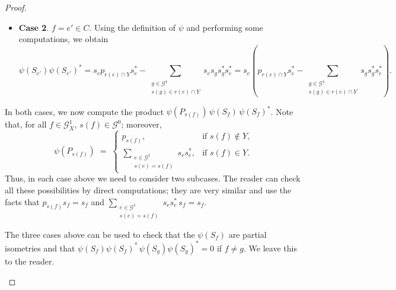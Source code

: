 \documentclass[12pt, reqno]{amsart}
\theoremstyle{definition}
\theoremstyle{remark}
\numberwithin{equation}{section}
\begin{document}
\begin{proof}
\begin{enumerate}
\begin{itemize}
\item \textbf{Case 2}. $f = e' \in C$. Using the definition of $\psi$ and performing some computations, we obtain
\[
\psi(S_{e'})\psi(S_{e'})^*
=
s_e p_{r(e) \cap Y} s_e^*
-
\sum_{\substack{g \in \mathcal{G}^1 \\ s(g) \in r(e) \cap Y}} s_e s_g s_g^* s_e^*
=
s_e \!\left(
p_{r(e) \cap Y} s_e^*
-
\sum_{\substack{g \in \mathcal{G}^1 \\ s(g) \in r(e) \cap Y}} s_g s_g^* s_e^*
\right)\!.
\]
\end{itemize}

In both cases, we now compute the product $\psi(P_{s(f)})\,\psi(S_f)\,\psi(S_f)^*$. Note that, for all $f \in \mathcal{G}_X^1$,
$s(f) \in \mathcal{G}^0$; moreover,
\[
\psi(P_{s(f)}) \;=\;
\begin{cases}
p_{s(f)}, & \text{if } s(f) \notin Y, \\[2pt]
\displaystyle \sum_{\substack{e \in \mathcal{G}^1 \\ s(e) = s(f)}} s_e s_e^*, & \text{if } s(f) \in Y.
\end{cases}
\]
Thus, in each case above we need to consider two subcases. The reader can check all these
possibilities by direct computations; they are very similar and use the facts that
$p_{s(f)} s_f = s_f$ and
$\sum_{\substack{e \in \mathcal{G}^1 \\ s(e) = s(f)}} s_e s_e^*\, s_f = s_f$.

The three cases above can be used to check that the $\psi(S_f)$ are partial isometries and that
$\psi(S_f) \psi(S_f)^* \, \psi(S_g) \psi(S_g)^* = 0$ if $f \neq g$. We leave this to the reader.


\end{enumerate}
\end{proof}
\end{document}
